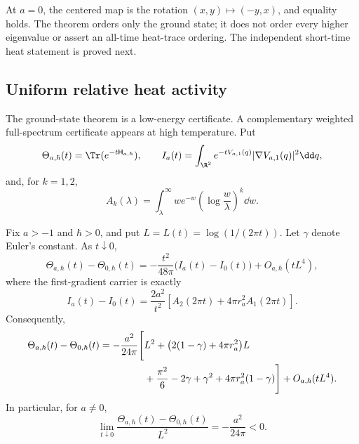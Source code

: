 At \(a=0\), the centered map is the rotation
\((x,y)\mapsto(-y,x)\), and equality holds.  The theorem orders only the
ground state; it does not order every higher eigenvalue or assert an all-time
heat-trace ordering.  The independent short-time heat statement is proved
next.

\subsection{Uniform relative heat activity}
\label{sec:relative-heat-activity}

The ground-state theorem is a low-energy certificate.  A complementary
weighted full-spectrum certificate appears at high temperature.  Put
\begin{equation}
 \Theta_{a,\hbar}(t)=\Tr(e^{-t\mathsf H_{a,\hbar}}),
 \qquad
 I_a(t)=\int_{\R^2}e^{-tV_{a,1}(q)}
 |\nabla V_{a,1}(q)|^2\dd q,
 \label{eq:heat-activity-definitions}
\end{equation}
and, for \(k=1,2\),
\begin{equation}
 A_k(\lambda)=\int_\lambda^\infty
 we^{-w}\left(\log\frac{w}{\lambda}\right)^k\dd w.
 \label{eq:Ak-definition}
\end{equation}

\begin{theorem}
\label{thm:relative-heat-activity}
Fix \(a>-1\) and \(\hbar>0\), and put
\(L=L(t)=\log(1/(2\pi t))\).  Let \(\gamma\) denote Euler's constant.
As \(t\downarrow0\),
\begin{equation}
 \Theta_{a,\hbar}(t)-\Theta_{0,\hbar}(t)
 =-\frac{t^2}{48\pi}\bigl(I_a(t)-I_0(t)\bigr)
 +O_{a,\hbar}(tL^4),
 \label{eq:relative-heat-carrier}
\end{equation}
where the first-gradient carrier is exactly
\begin{equation}
 I_a(t)-I_0(t)
 =\frac{2a^2}{t^2}
 \left[A_2(2\pi t)+4\pi r_a^2A_1(2\pi t)\right].
 \label{eq:exact-gradient-carrier}
\end{equation}
Consequently,
\begin{align}
 \Theta_{a,\hbar}(t)-\Theta_{0,\hbar}(t)
 =-\frac{a^2}{24\pi}\Bigg[&L^2+
 \bigl(2(1-\gamma)+4\pi r_a^2\bigr)L
 \notag\\
 &+\frac{\pi^2}{6}-2\gamma+\gamma^2
 +4\pi r_a^2(1-\gamma)\Bigg]
 +O_{a,\hbar}(tL^4).
 \label{eq:relative-heat-full-asymptotic}
\end{align}
In particular, for \(a\ne0\),
\begin{equation}
 \lim_{t\downarrow0}
 \frac{\Theta_{a,\hbar}(t)-\Theta_{0,\hbar}(t)}{L^2}
 =-\frac{a^2}{24\pi}<0.
 \label{eq:relative-heat-leading-limit}
\end{equation}
\end{theorem}


